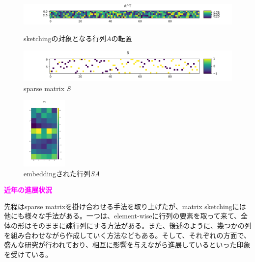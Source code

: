 \documentclass[10pt]{article}
\begin{document}
\begin{figure}[htbp]
    \begin{minipage}{0.6\hsize}
        \begin{center}
            \includegraphics[width=\hsize]{sparseMatrix_At.png}
        \end{center}
        \caption{sketchingの対象となる行列$A$の転置}
        \label{img:JLT_A}
    \end{minipage}
    \begin{minipage}{0.4\hsize}
        \begin{center}
            \includegraphics[width=\hsize]{sparseMatrix_S.png}
        \end{center}
        \caption{sparse matrix $S$}
        \label{img:JLT_S}
    \end{minipage}
\end{figure}

\begin{figure}
    \vspace{-1.5\baselineskip}
    \begin{center}
        \includegraphics[width=0.2\textwidth]{sparseMatrix_SA.png}
        \caption{embeddingされた行列$SA$}
        \label{img:JLT_SA}
    \end{center}
    \vspace{-1.5\baselineskip}
\end{figure}

\noindent
{\bf \textcolor{magenta}{近年の進展状況}}

先程はsparse matrixを掛け合わせる手法を取り上げたが、matrix sketchingには他にも様々な手法がある。一つは、element-wiseに行列の要素を取って来て、全体の形はそのままに疎行列にする方法がある\cite{kunduNoteRandomizedElementwise2014}。また、後述のように、幾つかの列を組み合わせながら作成していく方法などもある。そして、それぞれの方面で、盛んな研究が行われており、相互に影響を与えながら進展しているといった印象を受けている。
\end{document}
